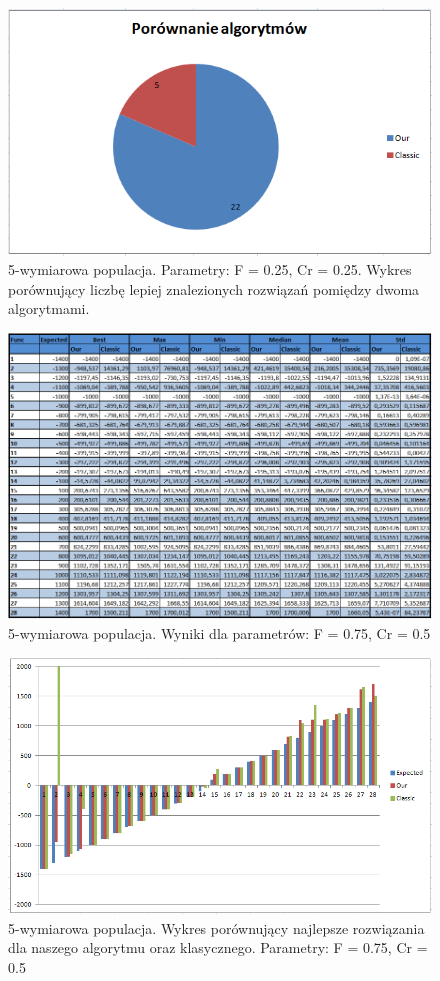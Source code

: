 \documentclass[a4paper]{article}
\begin{document}
\begin{figure}[!h]
\centering
\includegraphics[width=\textwidth]{F75Cr25L5statystyka.png}
\caption{5-wymiarowa populacja. Parametry: F = 0.25, Cr = 0.25. Wykres porównujący liczbę lepiej znalezionych rozwiązań pomiędzy dwoma algorytmami.}
\end{figure}

\begin{figure}[!h]
\centering
\includegraphics[width=\textwidth]{F75Cr5L5tab.png}
\caption{5-wymiarowa populacja. Wyniki dla parametrów: F = 0.75, Cr = 0.5}
\end{figure}

\begin{figure}[!h]
\centering
\includegraphics[width=\textwidth]{F75Cr5L5chart.png}
\caption{5-wymiarowa populacja. Wykres porównujący najlepsze rozwiązania dla naszego algorytmu oraz klasycznego. Parametry: F = 0.75, Cr = 0.5}
\end{figure}
\end{document}
